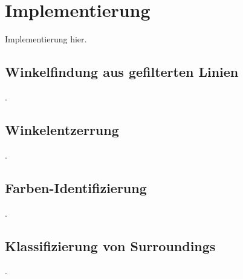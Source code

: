 
\section{Implementierung}
\label{sec:cv:implementierung}

Implementierung hier.

\subsection{Winkelfindung aus gefilterten Linien}
\label{sec:winkelfindung_impl}

.

\subsection{Winkelentzerrung}
\label{sec:winkelentzerrung_impl}

.

\subsection{Farben-Identifizierung}
\label{sec:farbidentifizierung_impl}

.

\subsection{Klassifizierung von Surroundings}
\label{sec:surroundings_impl}

.
